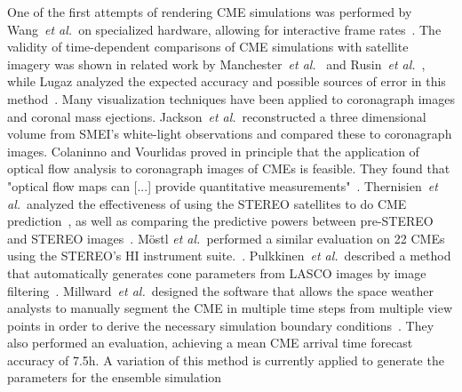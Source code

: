 \documentclass[journal]{vgtc}                %
\def\etal{\textit{et al.}}
\def\etal{\textit{et al.}}
\begin{document}
 One of the first attempts of rendering CME simulations was performed by Wang~\etal\ on specialized hardware, allowing for interactive frame rates~\cite{wang2004visualization}. The validity of time-dependent comparisons of CME simulations with satellite imagery was shown in related work by Manchester~\etal ~\cite{manchester2008three} and Rusin~\etal ~\cite{rusin2010comparing}, while Lugaz analyzed the expected accuracy and possible sources of error in this method~\cite{lugaz2010accuracy}. Many visualization techniques have been applied to coronagraph images and coronal mass ejections. Jackson~\etal\ reconstructed a three dimensional volume from SMEI's white-light observations and compared these to coronagraph images. Colaninno and Vourlidas proved in principle that the application of optical flow analysis to coronagraph images of CMEs is feasible. They found that "optical flow maps can [...] provide quantitative measurements"~\cite{Colaninno:2006ef}. Thernisien~\etal\ analyzed the effectiveness of using the STEREO satellites to do CME prediction~\cite{Thernisien:2009hx}, as well as comparing the predictive powers between pre-STEREO and STEREO images~\cite{Thernisien:2011fl}. M\"ostl \etal\ performed a similar evaluation on 22 CMEs using the STEREO's HI instrument suite.~\cite{Mostl:2014iv}. Pulkkinen~\etal\ described a method that automatically generates cone parameters from LASCO images by image filtering~\cite{Pulkkinen:2009gb}. Millward~\etal\ designed the software that allows the space weather analysts to manually segment the CME in multiple time steps from multiple view points in order to derive the necessary simulation boundary conditions~\cite{Millward:2013cm}. They also performed an evaluation, achieving a mean CME arrival time forecast accuracy of 7.5h. A variation of this method is currently applied to generate the parameters for the ensemble simulation



\end{document}
